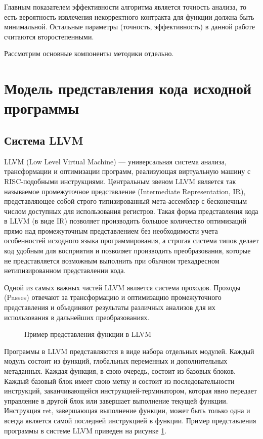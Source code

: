Главным показателем эффективности алгоритма является точность анализа, то есть вероятность извлечения некорректного контракта для функции должна быть минимальной. Остальные параметры (точность, эффективность) в данной работе считаются второстепенными.

Рассмотрим основные компоненты методики отдельно.

\section{Модель представления кода исходной программы}

\subsection{Система LLVM}
LLVM (Low Level Virtual Machine) --- универсальная система анализа, трансформации и оптимизации программ, реализующая виртуальную машину с RISC-подобными инструкциями. Центральным звеном LLVM является так называемое промежуточное представление (Intermediate Representation, IR), представляющее собой строго типизированный мета-ассемблер с бесконечным числом доступных для использования регистров.  Такая форма представления кода в LLVM (в виде IR) позволяет производить большое количество оптимизаций прямо над промежуточным представлением без необходимости учета особенностей исходного языка программирования, а строгая система типов делает код удобным для восприятия и позволяет производить преобразования, которые не представляется возможным выполнить при обычном трехадресном нетипизированном представлении кода.

Одной из самых важных частей LLVM является система проходов. Проходы (Passes) отвечают за трансформацию и оптимизацию промежуточного представления и объединяют результаты различных анализов для их использования в дальнейших преобразованиях.
\begin{figure}[h!]
\caption{Пример представления функции в LLVM}
\label{image:llvmIR}
\end{figure}

Программы в LLVM представляются в виде набора отдельных модулей. Каждый модуль состоит из функций, глобальных переменных и дополнительных метаданных. Каждая функция, в свою очередь, состоит из базовых блоков. Каждый базовый блок имеет свою метку и состоит из последовательности инструкций, заканчивающейся инструкцией-терминатором, которая явно передает управление в другой блок или завершает выполнение текущей функции. Инструкция ret, завершающая выполнение функции, может быть только одна и всегда является самой последней инструкцией в функции. Пример представления программы в системе LLVM приведен на рисунке \ref{image:llvmIR}.
	
